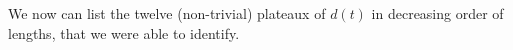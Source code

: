 \documentclass[10pt]{amsart}
\numberwithin{equation}{section}
\theoremstyle{definition}
\begin{document}
%
\noindent We now can list the twelve (non-trivial) plateaux of $d(t)$ in
decreasing order of lengths, that we were able to identify.  
\end{document}

